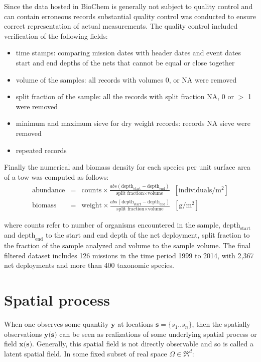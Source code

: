 \documentclass[letterpaper,portrait,11pt]{scrartcl}
\numberwithin{equation}{section}		%
\numberwithin{figure}{section}		%
\numberwithin{table}{section}				%
\begin{document}
\begin{appendices}
Since the data hosted in BioChem is generally not subject to quality control and can contain erroneous records substantial quality control was conducted to ensure correct representation of actual measurements. The quality control included verification of the following fields: 

\begin{itemize}
  \item time stamps: comparing mission dates with header dates and event dates 
  start and end depths of the nets that cannot be equal or close together
  \item volume of the samples: all records with volumes 0, or NA were removed
  \item split fraction of the sample: all the records with split fraction NA, 0 or $>$ 1 were removed 
  \item minimum and maximum sieve for dry weight records: records NA sieve were removed
  \item repeated records 
\end{itemize}


Finally the numerical and biomass density for each species per unit surface area of a tow was computed as follows: 
\begin{eqnarray*}
\text{abundance} &=& \text{counts} \times \frac{  abs( \text{depth}_{\text{start}} - \text{depth}_{\text{end}} ) } { \text{split fraction} \times \text{volume} } \; \; [\text{individuals}/ \text{m}^{2} ]  \\
\text{biomass} &=& \text{weight} \times \frac{ abs( \text{depth}_{\text{start}} - \text{depth}_{\text{end}} )} { \text{split fraction} \times \text{volume}} \; \; [\text{g}/\text{m}^2]
\end{eqnarray*}

where counts refer to number of organisms encountered in the sample, $\text{depth}_{\text{start}}$ and $\text{depth}_{\text{end}}$ to the start and end depth of the net deployment, split fraction to the fraction of the sample analyzed and volume to the sample volume. The final filtered dataset includes 126 missions in the time period 1999 to 2014, with 2,367 net deployments and more than 400 taxonomic species. 


\section{Spatial process}
\label{sec:spatialProcess}

When one observes some quantity $\textbf{y}$ at locations $\textbf{s} = \{s_1 .. s_n \}$, then the spatially  observations $\textbf{y(s)}$ can be seen as realizations of some underlying spatial process or field $\textbf{x(s)}$. Generally, this spatial field is not directly observable and so is called a latent spatial field. In some fixed subset of real space $\Omega \in \Re^d$:
 

\end{appendices}
\end{document}
